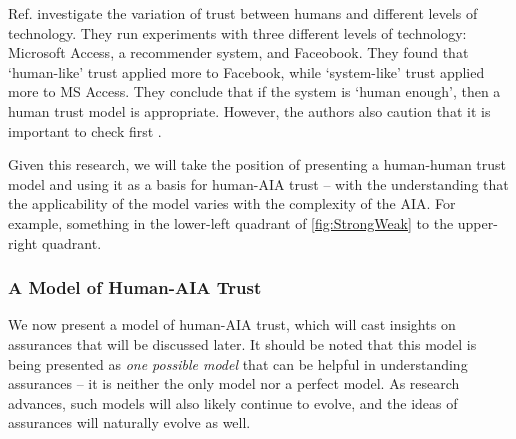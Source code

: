 
        Ref. \citet{Tripp2011-cq} investigate the variation of trust between humans and different levels of technology. They run experiments with three different levels of technology: Microsoft Access, a recommender system, and Faceobook. They found that `human-like' trust applied more to Facebook, while `system-like' trust applied more to MS Access. They conclude that if the system is `human enough', then a human trust model is appropriate. However, the authors also caution that it is important to check first .

        Given this research, we will take the position of presenting a human-human trust model and using it as a basis for human-AIA trust -- with the understanding that the applicability of the model varies with the complexity of the AIA. For example, something in the lower-left quadrant of \ref{fig:StrongWeak}  to the upper-right quadrant. 

\subsubsection{A Model of Human-AIA Trust}
We now present a model of human-AIA trust, which will cast insights on assurances that will be discussed later. It should be noted that this model is being presented as \emph{one possible model} that can be helpful in understanding assurances -- it is neither the only model nor a perfect model. As research advances, such models will also likely continue to evolve, and the ideas of assurances will naturally evolve as well.


